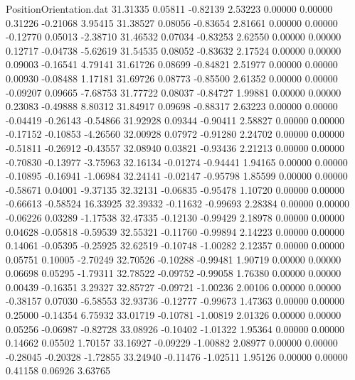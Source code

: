 \begin{filecontents}{PositionOrientation.dat}
  31.31335    0.05811   -0.82139     2.53223    0.00000    0.00000    0.31226   -0.21068    3.95415
  31.38527    0.08056   -0.83654     2.81661    0.00000    0.00000   -0.12770    0.05013   -2.38710
  31.46532    0.07034   -0.83253     2.62550    0.00000    0.00000    0.12717   -0.04738   -5.62619
  31.54535    0.08052   -0.83632     2.17524    0.00000    0.00000    0.09003   -0.16541    4.79141
  31.61726    0.08699   -0.84821     2.51977    0.00000    0.00000    0.00930   -0.08488    1.17181
  31.69726    0.08773   -0.85500     2.61352    0.00000    0.00000   -0.09207    0.09665   -7.68753
  31.77722    0.08037   -0.84727     1.99881    0.00000    0.00000    0.23083   -0.49888    8.80312
  31.84917    0.09698   -0.88317     2.63223    0.00000    0.00000   -0.04419   -0.26143   -0.54866
  31.92928    0.09344   -0.90411     2.58827    0.00000    0.00000   -0.17152   -0.10853   -4.26560
  32.00928    0.07972   -0.91280     2.24702    0.00000    0.00000   -0.51811   -0.26912   -0.43557
  32.08940    0.03821   -0.93436     2.21213    0.00000    0.00000   -0.70830   -0.13977   -3.75963
  32.16134   -0.01274   -0.94441     1.94165    0.00000    0.00000   -0.10895   -0.16941   -1.06984
  32.24141   -0.02147   -0.95798     1.85599    0.00000    0.00000   -0.58671    0.04001   -9.37135
  32.32131   -0.06835   -0.95478     1.10720    0.00000    0.00000   -0.66613   -0.58524   16.33925
  32.39332   -0.11632   -0.99693     2.28384    0.00000    0.00000   -0.06226    0.03289   -1.17538
  32.47335   -0.12130   -0.99429     2.18978    0.00000    0.00000    0.04628   -0.05818   -0.59539
  32.55321   -0.11760   -0.99894     2.14223    0.00000    0.00000    0.14061   -0.05395   -0.25925
  32.62519   -0.10748   -1.00282     2.12357    0.00000    0.00000    0.05751    0.10005   -2.70249
  32.70526   -0.10288   -0.99481     1.90719    0.00000    0.00000    0.06698    0.05295   -1.79311
  32.78522   -0.09752   -0.99058     1.76380    0.00000    0.00000    0.00439   -0.16351    3.29327
  32.85727   -0.09721   -1.00236     2.00106    0.00000    0.00000   -0.38157    0.07030   -6.58553
  32.93736   -0.12777   -0.99673     1.47363    0.00000    0.00000    0.25000   -0.14354    6.75932
  33.01719   -0.10781   -1.00819     2.01326    0.00000    0.00000    0.05256   -0.06987   -0.82728
  33.08926   -0.10402   -1.01322     1.95364    0.00000    0.00000    0.14662    0.05502    1.70157
  33.16927   -0.09229   -1.00882     2.08977    0.00000    0.00000   -0.28045   -0.20328   -1.72855
  33.24940   -0.11476   -1.02511     1.95126    0.00000    0.00000    0.41158    0.06926    3.63765

\end{filecontents}

